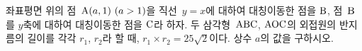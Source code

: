 좌표평면 위의 점~$\pt{A}(a{,}\mkern3mu 1)\ (a>1)$을 직선~$y=x$에 대하여 대칭이동한 점을 $\mathrm{B}$, 점~$\mathrm{B}$를 $y$축에 대하여 대칭이동한 점을 $\mathrm{C}$라 하자. 두 삼각형~$\mathrm{ABC}$, $\mathrm{AOC}$의 외접원의 반지름의 길이를 각각 $r_1$, $r_2$라 할 때, $r_1\times r_2=25\sqrt{2}$이다. 상수 $a$의 값을 구하시오. 
